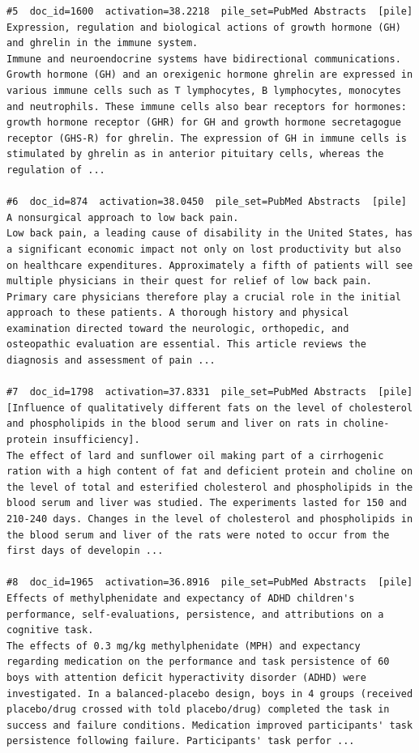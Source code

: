 \begin{verbatim}
#5  doc_id=1600  activation=38.2218  pile_set=PubMed Abstracts  [pile]
Expression, regulation and biological actions of growth hormone (GH) and ghrelin in the immune system.
Immune and neuroendocrine systems have bidirectional communications. Growth hormone (GH) and an orexigenic hormone ghrelin are expressed in various immune cells such as T lymphocytes, B lymphocytes, monocytes and neutrophils. These immune cells also bear receptors for hormones: growth hormone receptor (GHR) for GH and growth hormone secretagogue receptor (GHS-R) for ghrelin. The expression of GH in immune cells is stimulated by ghrelin as in anterior pituitary cells, whereas the regulation of ...

#6  doc_id=874  activation=38.0450  pile_set=PubMed Abstracts  [pile]
A nonsurgical approach to low back pain.
Low back pain, a leading cause of disability in the United States, has a significant economic impact not only on lost productivity but also on healthcare expenditures. Approximately a fifth of patients will see multiple physicians in their quest for relief of low back pain. Primary care physicians therefore play a crucial role in the initial approach to these patients. A thorough history and physical examination directed toward the neurologic, orthopedic, and osteopathic evaluation are essential. This article reviews the diagnosis and assessment of pain ...

#7  doc_id=1798  activation=37.8331  pile_set=PubMed Abstracts  [pile]
[Influence of qualitatively different fats on the level of cholesterol and phospholipids in the blood serum and liver on rats in choline-protein insufficiency].
The effect of lard and sunflower oil making part of a cirrhogenic ration with a high content of fat and deficient protein and choline on the level of total and esterified cholesterol and phospholipids in the blood serum and liver was studied. The experiments lasted for 150 and 210-240 days. Changes in the level of cholesterol and phospholipids in the blood serum and liver of the rats were noted to occur from the first days of developin ...

#8  doc_id=1965  activation=36.8916  pile_set=PubMed Abstracts  [pile]
Effects of methylphenidate and expectancy of ADHD children's performance, self-evaluations, persistence, and attributions on a cognitive task.
The effects of 0.3 mg/kg methylphenidate (MPH) and expectancy regarding medication on the performance and task persistence of 60 boys with attention deficit hyperactivity disorder (ADHD) were investigated. In a balanced-placebo design, boys in 4 groups (received placebo/drug crossed with told placebo/drug) completed the task in success and failure conditions. Medication improved participants' task persistence following failure. Participants' task perfor ...


\end{verbatim}
